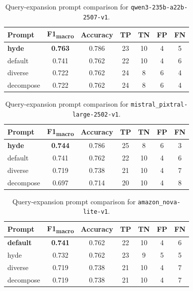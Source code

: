 \begin{table}[htbp]
\centering
\caption{Query-expansion prompt comparison for \texttt{qwen3-235b-a22b-2507-v1}.}
\label{tab:cg-qwen3}
\begin{tabular}{lcccccc}
\toprule
Prompt & F1\textsubscript{macro} & Accuracy & TP & TN & FP & FN \\
\midrule
\textbf{hyde} & \textbf{0.763} & 0.786 & 23 & 10 & 4 & 5 \\
default   & 0.741 & 0.762 & 22 & 10 & 4 & 6 \\
diverse   & 0.722 & 0.762 & 24 &  8 & 6 & 4 \\
decompose & 0.722 & 0.762 & 24 &  8 & 6 & 4 \\
\bottomrule
\end{tabular}
\end{table}

\begin{table}[htbp]
\centering
\caption{Query-expansion prompt comparison for \texttt{mistral\_pixtral-large-2502-v1}.}
\label{tab:cg-mistral}
\begin{tabular}{lcccccc}
\toprule
Prompt & F1\textsubscript{macro} & Accuracy & TP & TN & FP & FN \\
\midrule
\textbf{hyde} & \textbf{0.744} & 0.786 & 25 &  8 & 6 & 3 \\
default   & 0.741 & 0.762 & 22 & 10 & 4 & 6 \\
diverse   & 0.719 & 0.738 & 21 & 10 & 4 & 7 \\
decompose & 0.697 & 0.714 & 20 & 10 & 4 & 8 \\
\bottomrule
\end{tabular}
\end{table}

\begin{table}[htbp]
\centering
\caption{Query-expansion prompt comparison for \texttt{amazon\_nova-lite-v1}.}
\label{tab:cg-nova-lite}
\begin{tabular}{lcccccc}
\toprule
Prompt & F1\textsubscript{macro} & Accuracy & TP & TN & FP & FN \\
\midrule
\textbf{default} & \textbf{0.741} & 0.762 & 22 & 10 & 4 & 6 \\
hyde      & 0.732 & 0.762 & 23 &  9 & 5 & 5 \\
diverse   & 0.719 & 0.738 & 21 & 10 & 4 & 7 \\
decompose & 0.719 & 0.738 & 21 & 10 & 4 & 7 \\
\bottomrule
\end{tabular}
\end{table}


